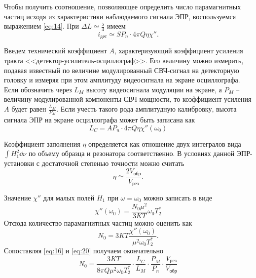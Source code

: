 Чтобы получить соотношение, позволяющее определить число  парамагнитных частиц исходя из характеристики наблюдаемого сигнала ЭПР, воспользуемся выражением \eqref{eq:14}. При $\Delta L \simeq \frac{\lambda}{4}$ имеем
\begin{equation}
    \label{eq:15}
    i_{\text{дет}} \simeq S P_n \cdot 4 \pi Q \eta \chi''.
\end{equation}

Введем технический коэффициент $A$, характеризующий коэффициент усиления тракта <<детектор-усилитель-осциллограф>>. Его величину можно измерить, подавая известный по величине модулированный СВЧ-сигнал на детекторную головку и измеряя при этом амплитуду видеосигнала на экране осциллографа. Если обозначить через  $L_M$ высоту видеосигнала модуляции 
на экране, а $P_M$ -- величину модулированной компоненты СВЧ-мощности, то коэффициент усиления $A$ будет равен  $\frac{L_M}{P_M}$. Если учесть такого рода амплитудную калибровку, высота сигнала ЭПР на экране осциллографа может быть записана как
\begin{equation}
    \label{eq:16}
    L_{C} = A P_n \cdot 4 \pi Q \eta \chi''(\omega_{0})
\end{equation}

Коэффициент заполнения $\eta$ определяется как отношение  двух интегралов вида  $\int H_{1}^2 \dd{\nu}$ по объему образца и резонатора соответственно. В условиях данной ЭПР-установки
с достаточной степенью точности можно считать 
\begin{equation}
    \label{eq:17}
    \eta \simeq \frac{2 V_{\text{обр}}}{V_{\text{рез}}}.
\end{equation}

Значение $\chi''$ для малых полей  $H_{1}$ при $\omega = \omega_{0}$ можно записать в виде
\begin{equation}
    \label{eq:18}
    \chi '' (\omega_{0}) = \frac{N_{0} \mu^2}{3KT} \omega_{0} T_2^*
\end{equation}
Отсюда количество парамагнитных частиц можно оценить как
\begin{equation}
    \label{eq:20}
    N_0 = 3KT \frac{\chi''(\omega_{0})}{\mu^2 \omega_0 T_2^*}.
\end{equation}
Сопоставляя \eqref{eq:16} и \eqref{eq:20} получаем окончательно
\begin{equation}
    \label{eq:21}
    N_0 = \frac{3KT}{8\pi Q \mu^2 \omega_{0} T_2^*} \cdot \frac{L_C}{L_M}  \cdot \frac{P_M}{P_n} \cdot \frac{V_{\text{рез}}}{V_{\text{обр}}}
\end{equation}

